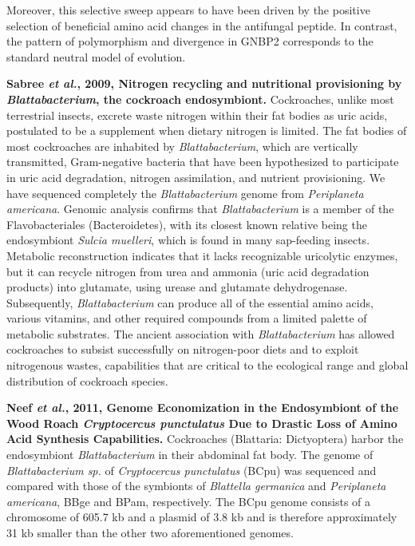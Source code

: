\documentclass[11pt]{article}
\begin{document}
\begin{sloppypar}
Moreover, this selective sweep appears to have been driven by the positive selection of beneficial amino acid changes in the antifungal peptide. 
In contrast, the pattern of polymorphism and divergence in GNBP2 corresponds to the standard neutral model of evolution.
\par
\textbf{Sabree \textit{et al.}, 2009, Nitrogen recycling and nutritional provisioning by \textit{Blattabacterium}, the cockroach endosymbiont.} \newline
Cockroaches, unlike most terrestrial insects, excrete waste nitrogen within their fat bodies as uric acids, postulated to be a supplement when dietary nitrogen is limited. 
The fat bodies of most cockroaches are inhabited by \textit{Blattabacterium}, which are vertically transmitted, Gram-negative bacteria that have been hypothesized to participate in uric acid degradation, nitrogen assimilation, and nutrient provisioning. 
We have sequenced completely the \textit{Blattabacterium} genome from \textit{Periplaneta americana}. 
Genomic analysis confirms that \textit{Blattabacterium} is a member of the Flavobacteriales (Bacteroidetes), with its closest known relative being the endosymbiont \textit{Sulcia muelleri}, which is found in many sap-feeding insects. 
Metabolic reconstruction indicates that it lacks recognizable uricolytic enzymes, but it can recycle nitrogen from urea and ammonia (uric acid degradation products) into glutamate, using urease and glutamate dehydrogenase. 
Subsequently, \textit{Blattabacterium} can produce all of the essential amino acids, various vitamins, and other required compounds from a limited palette of metabolic substrates. 
The ancient association with \textit{Blattabacterium} has allowed cockroaches to subsist successfully on nitrogen-poor diets and to exploit nitrogenous wastes, capabilities that are critical to the ecological range and global distribution of cockroach species.
\par
\textbf{Neef \textit{et al.}, 2011, Genome Economization in the Endosymbiont of the Wood Roach \textit{Cryptocercus punctulatus} Due to Drastic Loss of Amino Acid Synthesis Capabilities.} \newline
Cockroaches (Blattaria: Dictyoptera) harbor the endosymbiont \textit{Blattabacterium} in their abdominal fat body. 
The genome of \textit{Blattabacterium sp.} of \textit{Cryptocercus punctulatus} (BCpu) was sequenced and compared with those of the symbionts of \textit{Blattella germanica} and \textit{Periplaneta americana}, BBge and BPam, respectively. 
The BCpu genome consists of a chromosome of 605.7 kb and a plasmid of 3.8 kb and is therefore approximately 31 kb smaller than the other two aforementioned genomes. 

\end{sloppypar}
\end{document}
